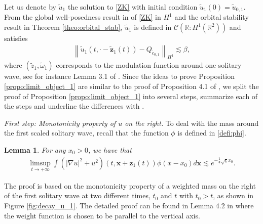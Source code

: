 \documentclass[reqno,10pt]{amsart}
\newtheorem{lemm}{Lemma}[section]
\numberwithin{equation}{section}
\newcommand{\bx}{\mathbf{x}}
\newcommand{\bz}{\mathbf{z}}
\begin{document}
		Let us denote by $\tilde{u}_1$ the solution to \ref{ZK} with initial condition $\tilde{u}_1(0)=\tilde{u}_{0,1}$. From the global well-posedness result in \cite{Fam} of \ref{ZK} in $H^1$ and the orbital stability result in Theorem \ref{theo:orbital_stab}, $\tilde{u}_1$ is defined in $\mathcal{C}(\mathbb{R}: H^1(\mathbb{R}^2))$ and satisfies
		\begin{align*}
			\left\| \tilde{u}_1 \left( t, \cdot - \tilde{\bz}_1(t) \right) - Q_{\tilde{c}_{0,1}} \right\|_{H^1} \lesssim \beta,
		\end{align*}
		where $(\tilde{z}_1,\tilde{\omega}_1)$ corresponds to the modulation function around one solitary wave, see for instance Lemma 3.1 of \cite{CMPS16}. Since the ideas to prove Proposition \ref{propo:limit_object_1} are similar to the proof of Proposition 4.1 of \cite{CMPS16}, we split the proof of Proposition \ref{propo:limit_object_1} into several steps, summarize each of the steps and underline the differences with \cite{CMPS16}.
		
		\vspace{0.5cm}
  \noindent \textit{First step: Monotonicity property of $u$ on the right.}
To deal with the mass around the first scaled solitary wave, recall that the function $\phi$ is defined in \eqref{defi:phi}.
        
        \begin{lemm}\label{lemm:decay_u_1}
		For any $x_0>0$, we have that
			\begin{align*}
				\limsup_{t\rightarrow + \infty} \int \left( \vert \nabla u \vert^2 + u^2 \right) \left(t, \bx + \bz_1(t) \right) \phi \left( x- x_0 \right) d\bx \lesssim e^{- \frac14 \sqrt{\underline{c}} x_0}.
			\end{align*}
		\end{lemm}
		The proof is based on the monotonicity property of a weighted mass on the right of the first solitary wave at two different times, $t_0$ and $t$ with $t_0>t$, as shown in Figure \ref{fig:decay_u_1}. The detailed proof can be found in Lemma 4.2 in \cite{CMPS16} where the weight function is chosen to be parallel to the vertical axis.
  
\end{document}
